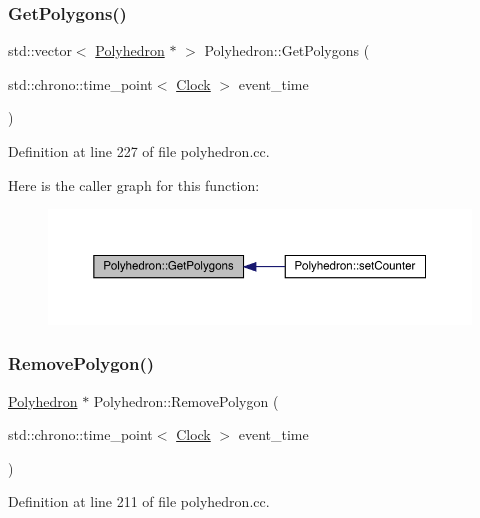 \subsubsection{\texorpdfstring{Get\+Polygons()}{GetPolygons()}}
{\footnotesize\ttfamily std\+::vector$<$ \hyperlink{class_polyhedron}{Polyhedron} $\ast$ $>$ Polyhedron\+::\+Get\+Polygons (\begin{DoxyParamCaption}\item[{std\+::chrono\+::time\+\_\+point$<$ \hyperlink{universe_8h_a0ef8d951d1ca5ab3cfaf7ab4c7a6fd80}{Clock} $>$}]{event\+\_\+time }\end{DoxyParamCaption})}



Definition at line 227 of file polyhedron.\+cc.

Here is the caller graph for this function\+:
\nopagebreak
\begin{figure}[H]
\begin{center}
\leavevmode
\includegraphics[width=350pt]{class_polyhedron_adeaf461cc8504a225f6344b954c196a8_icgraph}
\end{center}
\end{figure}
\mbox{\label{class_polyhedron_a3b411fa617291a2a2d5df92b819285b4}} 
\subsubsection{\texorpdfstring{Remove\+Polygon()}{RemovePolygon()}}
{\footnotesize\ttfamily \hyperlink{class_polyhedron}{Polyhedron} $\ast$ Polyhedron\+::\+Remove\+Polygon (\begin{DoxyParamCaption}\item[{std\+::chrono\+::time\+\_\+point$<$ \hyperlink{universe_8h_a0ef8d951d1ca5ab3cfaf7ab4c7a6fd80}{Clock} $>$}]{event\+\_\+time }\end{DoxyParamCaption})}



Definition at line 211 of file polyhedron.\+cc.

